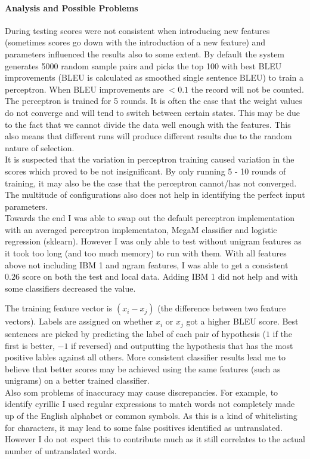 \documentclass{article}
\begin{document}
\paragraph{Analysis and Possible Problems}

During testing scores were not consistent when introducing new features (sometimes scores go down with the introduction of a new feature) and parameters influenced the results also to some extent. By default the system generates 5000 random sample pairs and picks the top 100 with best BLEU improvements (BLEU is calculated as smoothed single sentence BLEU) to train a perceptron. When BLEU improvements are $< 0.1$ the record will not be counted. The perceptron is trained for 5 rounds. It is often the case that the weight values do not converge and will tend to switch between certain states. This may be due to the fact that we cannot divide the data well enough with the features. This also means that different runs will produce different results due to the random nature of selection.\\

It is suspected that the variation in perceptron training caused variation in the scores which proved to be not insignificant. By only running 5 - 10 rounds of training, it may also be the case that the perceptron cannot/has not converged. The multitude of configurations also does not help in identifying the perfect input parameters.\\

Towards the end I was able to swap out the default perceptron implementation with an averaged perceptron implementaton, MegaM classifier and logistic regression (sklearn). However I was only able to test without unigram features as it took too long (and too much memory) to run with them. With all features above not including IBM 1 and ngram features, I was able to get a consistent $0.26$ score on both the test and local data. Adding IBM 1 did not help and with some classifiers decreased the value.

The training feature vector is $(x_i - x_j)$ (the difference between two feature vectors). Labels are assigned on whether $x_i$ or $x_j$ got a higher BLEU score. Best sentences are picked by predicting the label of each pair of hypothesis ($1$ if the first is better, $-1$ if reversed) and outputting the hypothesis that has the most positive lables against all others. More consistent classifier results lead me to believe that better scores may be achieved using the same features (such as unigrams) on a better trained classifier. \\

Also som problems of inaccuracy may cause discrepancies. For example, to identify cyrillic I used regular expressions to match words not completely made up of the English alphabet or common symbols. As this is a kind of whitelisting for characters, it may lead to some false positives identified as untranslated. However I do not expect this to contribute much as it still correlates to the actual number of untranslated words.


\end{document}
